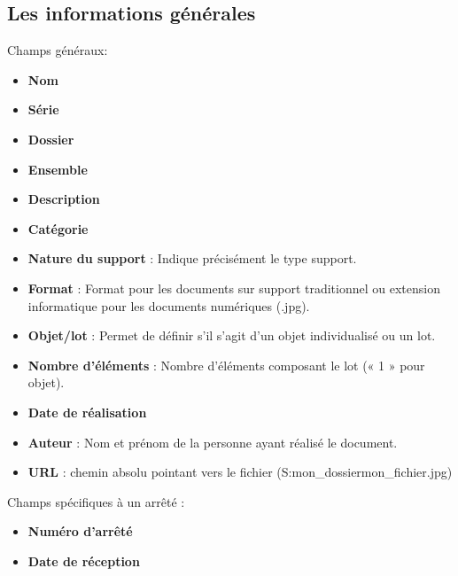 \documentclass[letterpaper,10pt,french]{sphinxmanual}
\begin{document}
\subsection{Les informations générales}
\label{manuel/formulaire_documentation:les-informations-generales}
Champs généraux:
\begin{itemize}
\item {} 
\textbf{Nom}

\item {} 
\textbf{Série}

\item {} 
\textbf{Dossier}

\item {} 
\textbf{Ensemble}

\item {} 
\textbf{Description}

\item {} 
\textbf{Catégorie}

\item {} 
\textbf{Nature du support} : Indique précisément le type support.

\item {} 
\textbf{Format} : Format pour les documents sur support traditionnel ou extension informatique pour les documents numériques (.jpg).

\item {} 
\textbf{Objet/lot} : Permet de définir s’il s’agit d’un objet individualisé ou un lot.

\item {} 
\textbf{Nombre d'éléments} : Nombre d’éléments composant le lot (« 1 » pour objet).

\item {} 
\textbf{Date de réalisation}

\item {} 
\textbf{Auteur} : Nom et prénom de la personne ayant réalisé le document.

\item {} 
\textbf{URL} : chemin absolu pointant vers le fichier (S:mon\_dossiermon\_fichier.jpg)

\end{itemize}

Champs spécifiques à un arrêté :
\begin{itemize}
\item {} 
\textbf{Numéro d'arrêté}

\item {} 
\textbf{Date de réception}

\end{itemize}
\end{document}
